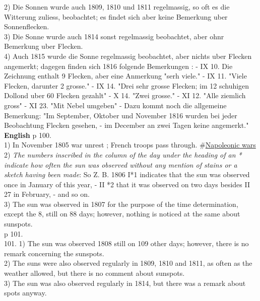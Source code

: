 \documentclass[12pt]{article}
\begin{document}
2) Die Sonnen wurde auch 1809, 1810 und 1811 regelmassig, so oft es die Witterung zuliess, beobachtet; es findet sich aber keine Bemerkung uber Sonnenflecken.\\

3) Die Sonne wurde auch 1814 sonst regelmassig beobachtet, aber ohnr Bemerkung uber Flecken. \\

4) Auch 1815 wurde die Sonne regelmassig beobachtet, aber nichts uber Flecken angemerkt; dagegen finden sich 1816 folgende Bemerkungen : 
- IX 10. Die Zeichnung enthalt 9 Flecken, aber eine Anmerkung "serh viele." 
- IX 11. "Viele Flecken, darunter 2 grosse."
-  IX 14. "Drei sehr grosse Flecken; im 12 schuhigen Dollond uber 60 Flecken gezahlt" 
- X 14. "Zwei grosse."
- XI 12. "Alle ziemlich gross"
- XI 23. "Mit Nebel umgeben" - Dazu kommt noch die allgemeine Bemerkung: "Im September, Oktober und November 1816 wurden bei jeder Beobachtung Flecken gesehen, - im December an zwei Tagen keine angemerkt."\\

\textbf{English}
p 100.\\
1) In November 1805 war unrest ; French troops pass through. \#\href{https://en.wikipedia.org/wiki/Napoleonic_Wars}{Napoleonic wars}\\

2) \textit{The numbers inscribed in the column of the day under the heading of an * indicate how often the sun was observed without any mention of stains or a sketch having been made}: So Z. B. 1806 I*1 indicates that the sun was observed once in January of this year, - II *2 that it was observed on two days besides II 27 in February, - and so on.\\

3) The sun was observed in 1807 for the purpose of the time determination, except the 8, still on 88 days; however, nothing is noticed at the same about sunspots.\\

p 101.\\
101. 
1) The sun was observed 1808 still on 109 other days; however, there is no remark concerning the sunspots.\\ 

2) The suns were also observed regularly in 1809, 1810 and 1811, as often as the weather allowed, but there is no comment about sunspots.\\

3) The sun was also observed regularly in 1814, but there was a remark about spots anyway. \\
\end{document}
